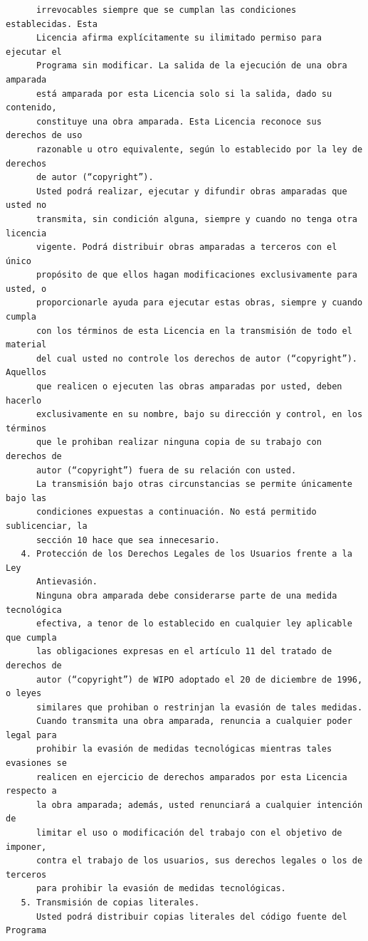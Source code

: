 \begin{verbatim}
      irrevocables siempre que se cumplan las condiciones establecidas. Esta
      Licencia afirma explícitamente su ilimitado permiso para ejecutar el
      Programa sin modificar. La salida de la ejecución de una obra amparada
      está amparada por esta Licencia solo si la salida, dado su contenido,
      constituye una obra amparada. Esta Licencia reconoce sus derechos de uso
      razonable u otro equivalente, según lo establecido por la ley de derechos
      de autor (“copyright”).
      Usted podrá realizar, ejecutar y difundir obras amparadas que usted no
      transmita, sin condición alguna, siempre y cuando no tenga otra licencia
      vigente. Podrá distribuir obras amparadas a terceros con el único
      propósito de que ellos hagan modificaciones exclusivamente para usted, o
      proporcionarle ayuda para ejecutar estas obras, siempre y cuando cumpla
      con los términos de esta Licencia en la transmisión de todo el material
      del cual usted no controle los derechos de autor (“copyright”). Aquellos
      que realicen o ejecuten las obras amparadas por usted, deben hacerlo
      exclusivamente en su nombre, bajo su dirección y control, en los términos
      que le prohiban realizar ninguna copia de su trabajo con derechos de
      autor (“copyright”) fuera de su relación con usted.
      La transmisión bajo otras circunstancias se permite únicamente bajo las
      condiciones expuestas a continuación. No está permitido sublicenciar, la
      sección 10 hace que sea innecesario.
   4. Protección de los Derechos Legales de los Usuarios frente a la Ley
      Antievasión.
      Ninguna obra amparada debe considerarse parte de una medida tecnológica
      efectiva, a tenor de lo establecido en cualquier ley aplicable que cumpla
      las obligaciones expresas en el artículo 11 del tratado de derechos de
      autor (“copyright”) de WIPO adoptado el 20 de diciembre de 1996, o leyes
      similares que prohiban o restrinjan la evasión de tales medidas.
      Cuando transmita una obra amparada, renuncia a cualquier poder legal para
      prohibir la evasión de medidas tecnológicas mientras tales evasiones se
      realicen en ejercicio de derechos amparados por esta Licencia respecto a
      la obra amparada; además, usted renunciará a cualquier intención de
      limitar el uso o modificación del trabajo con el objetivo de imponer,
      contra el trabajo de los usuarios, sus derechos legales o los de terceros
      para prohibir la evasión de medidas tecnológicas.
   5. Transmisión de copias literales.
      Usted podrá distribuir copias literales del código fuente del Programa

\end{verbatim}
